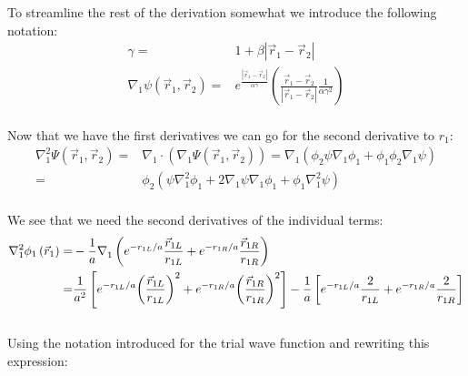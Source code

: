 To streamline the rest of the derivation somewhat we introduce the following notation:
\begin{align}
\gamma  =& 1 + \beta \left| {{{\vec r}_1} - {{\vec r}_2}} \right|\\
\nabla _1^{}\psi \left( {{{\vec r}_1},{{\vec r}_2}} \right) =&  {e^{\frac{{\left| {{{\vec r}_1} - {{\vec r}_2}} \right|}}{{\alpha \gamma }}}}\left( {\frac{{{{\vec r}_1} - {{\vec r}_2}}}{{\left| {{{\vec r}_1} - {{\vec r}_2}} \right|}}\frac{1}{{\alpha {\gamma ^2}}}} \right)
\end{align}\\
Now that we have the first derivatives we can go for the second derivative to $r_1$:
\begin{align}
\nabla _1^2\Psi \left( {{{\vec r}_1},{{\vec r}_2}} \right) =& \nabla _1^{} \cdot \left( {\nabla _1^{}\Psi \left( {{{\vec r}_1},{{\vec r}_2}} \right)} \right) = \nabla _1^{}\left( {{\phi _2}\psi \nabla _1^{}{\phi _1} + {\phi _1}{\phi _2}\nabla _1^{}\psi } \right)\nonumber\\
=& {\phi _2}\left( {\psi \nabla _1^2{\phi _1} + 2\nabla _1^{}\psi \nabla _1^{}{\phi _1} + {\phi _1}\nabla _1^2\psi } \right)
\end{align}\\
We see that we need the second derivatives of the individual terms:
\begin{align}
\nabla _1^2{\phi _1}\left( {{{\vec r}_1}} \right) =&  - \frac{1}{a}\nabla _1^{}\left( {{e^{ - {{{r_{1L}}} \mathord{\left/
 {\vphantom {{{r_{1L}}} a}} \right.
 \kern-\nulldelimiterspace} a}}}\frac{{{{\vec r}_{1L}}}}{{{r_{1L}}}} + {e^{ - {{{r_{1R}}} \mathord{\left/
 {\vphantom {{{r_{1R}}} a}} \right.
 \kern-\nulldelimiterspace} a}}}\frac{{{{\vec r}_{1R}}}}{{{r_{1R}}}}} \right)\nonumber\\
 =& \frac{1}{{{a^2}}}\left[ {{e^{ - {{{r_{1L}}} \mathord{\left/
 {\vphantom {{{r_{1L}}} a}} \right.
 \kern-\nulldelimiterspace} a}}}{{\left( {\frac{{{{\vec r}_{1L}}}}{{{r_{1L}}}}} \right)}^2} + {e^{ - {{{r_{1R}}} \mathord{\left/
 {\vphantom {{{r_{1R}}} a}} \right.
 \kern-\nulldelimiterspace} a}}}{{\left( {\frac{{{{\vec r}_{1R}}}}{{{r_{1R}}}}} \right)}^2}} \right] - \frac{1}{a}\left[ {{e^{ - {{{r_{1L}}} \mathord{\left/
 {\vphantom {{{r_{1L}}} a}} \right.
 \kern-\nulldelimiterspace} a}}}\frac{2}{{{r_{1L}}}} + {e^{ - {{{r_{1R}}} \mathord{\left/
 {\vphantom {{{r_{1R}}} a}} \right.
 \kern-\nulldelimiterspace} a}}}\frac{2}{{{r_{1R}}}}} \right]
 \end{align}\\
 Using the notation introduced for the trial wave function and rewriting this expression:
